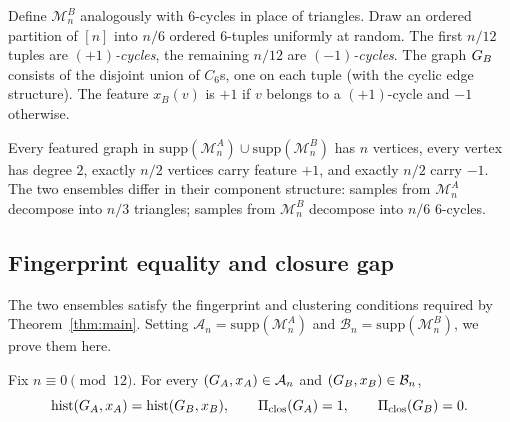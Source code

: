 Define $\mathcal{M}_n^B$ analogously with $6$-cycles in place of
triangles. Draw an ordered partition of $[n]$ into $n/6$ ordered
$6$-tuples uniformly at random. The first $n/12$ tuples are
\emph{$(+1)$-cycles}, the remaining $n/12$ are \emph{$(-1)$-cycles}.
The graph $G_B$ consists of the disjoint union of $C_6$s, one on
each tuple (with the cyclic edge structure). The feature $x_B(v)$ is
$+1$ if $v$ belongs to a $(+1)$-cycle and $-1$ otherwise.

Every featured graph in $\mathrm{supp}(\mathcal{M}_n^A) \cup
\mathrm{supp}(\mathcal{M}_n^B)$ has $n$ vertices, every vertex has
degree $2$, exactly $n/2$ vertices carry feature $+1$, and exactly
$n/2$ carry $-1$. The two ensembles differ in their component
structure: samples from $\mathcal{M}_n^A$ decompose into $n/3$
triangles; samples from $\mathcal{M}_n^B$ decompose into $n/6$
$6$-cycles.

\subsection{Fingerprint equality and closure gap}

The two ensembles satisfy the fingerprint and clustering conditions
required by Theorem~\ref{thm:main}. Setting $\mathcal{A}_n =
\mathrm{supp}(\mathcal{M}_n^A)$ and $\mathcal{B}_n =
\mathrm{supp}(\mathcal{M}_n^B)$, we prove them here.

\begin{proposition}\label{prop:entanglement}
Fix $n \equiv 0 \pmod{12}$. For every $(G_A, x_A) \in
\mathcal{A}_n$ and $(G_B, x_B) \in \mathcal{B}_n$,
\[
\mathrm{hist}(G_A, x_A) = \mathrm{hist}(G_B, x_B),
\qquad \Pi_{\mathrm{clos}}(G_A) = 1, \qquad \Pi_{\mathrm{clos}}(G_B) = 0.
\]
\end{proposition}

